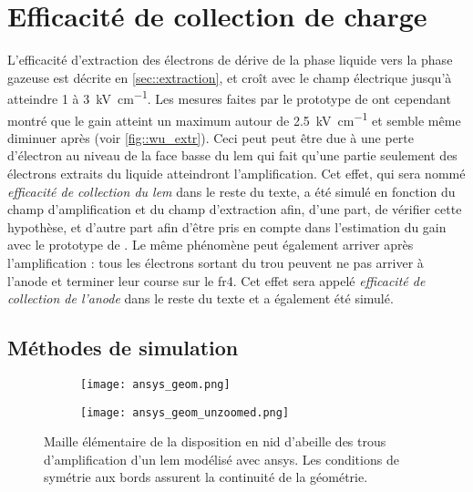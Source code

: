   \section{Efficacité de collection de charge}\label{sec::efficacites}
    
    L'efficacité d'extraction des électrons de dérive de la phase liquide vers la phase gazeuse est décrite en \autoref{sec::extraction}, et croît avec le champ électrique jusqu'à atteindre 1 à \SI{3}{\kilo\volt\per\centi\meter}. Les mesures faites par le prototype de \threeL{} ont cependant montré que le gain atteint un maximum autour de \SI{2.5}{\kilo\volt\per\centi\meter} et semble même diminuer après\cite{Wu2017} (voir \autoref{fig::wu_extr}). Ceci peut peut être due à une perte d'électron au niveau de la face basse du \gls{lem} qui fait qu'une partie seulement des électrons extraits du liquide atteindront l'amplification. Cet effet, qui sera nommé \textit{efficacité de collection du \gls{lem}} dans le reste du texte, a été simulé en fonction du champ d'amplification et du champ d'extraction afin, d'une part, de vérifier cette hypothèse, et d'autre part afin d'être pris en compte dans l'estimation du gain avec le prototype de \TOO{}. Le même phénomène peut également arriver après l'amplification : tous les électrons sortant du trou peuvent ne pas arriver à l'anode et terminer leur course sur le \gls{fr4}. Cet effet sera appelé \textit{efficacité de collection de l'anode} dans le reste du texte et a également été simulé.
    
    \subsection{Méthodes de simulation}
        
      \begin{figure}[htpb]
        \begin{subfigure}[t]{0.48\textwidth}
          \texttt{[image: ansys\_geom.png]}
        \end{subfigure}
        \hfill
        \begin{subfigure}[t]{0.48\textwidth}
          \texttt{[image: ansys\_geom\_unzoomed.png]}
        \end{subfigure}
        \caption{\label{fig::ansys_geom}Maille élémentaire de la disposition en nid d'abeille des trous d'amplification d'un \gls{lem} modélisé avec \gls{ansys}. Les conditions de symétrie aux bords assurent la continuité de la géométrie.}
      \end{figure}
            
